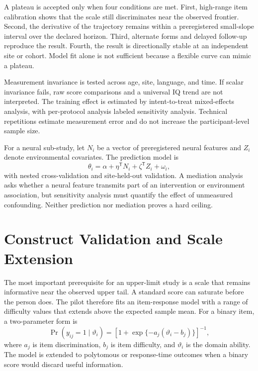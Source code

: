 \documentclass[conference]{IEEEtran}
\begin{document}
A plateau is accepted only when four conditions are met. First, high-range item calibration shows that the scale still discriminates near the observed frontier. Second, the derivative of the trajectory remains within a preregistered small-slope interval over the declared horizon. Third, alternate forms and delayed follow-up reproduce the result. Fourth, the result is directionally stable at an independent site or cohort. Model fit alone is not sufficient because a flexible curve can mimic a plateau.

Measurement invariance is tested across age, site, language, and time. If scalar invariance fails, raw score comparisons and a universal IQ trend are not interpreted. The training effect is estimated by intent-to-treat mixed-effects analysis, with per-protocol analysis labeled sensitivity analysis. Technical repetitions estimate measurement error and do not increase the participant-level sample size.

For a neural sub-study, let $N_i$ be a vector of preregistered neural features and $Z_i$ denote environmental covariates. The prediction model is
\begin{equation}
\theta_i=\alpha+\eta^{\mathsf T}N_i+\zeta^{\mathsf T}Z_i+\omega_i,
\label{eq:neural}
\end{equation}
with nested cross-validation and site-held-out validation. A mediation analysis asks whether a neural feature transmits part of an intervention or environment association, but sensitivity analysis must quantify the effect of unmeasured confounding. Neither prediction nor mediation proves a hard ceiling.

\section{Construct Validation and Scale Extension}
\label{sec:validation}
The most important prerequisite for an upper-limit study is a scale that remains informative near the observed upper tail. A standard score can saturate before the person does. The pilot therefore fits an item-response model with a range of difficulty values that extends above the expected sample mean. For a binary item, a two-parameter form is
\begin{equation}
\Pr(y_{ij}=1\mid\vartheta_i)=[1+\exp\{-a_j(\vartheta_i-b_j)\}]^{-1},
\label{eq:irt}
\end{equation}
where $a_j$ is item discrimination, $b_j$ is item difficulty, and $\vartheta_i$ is the domain ability. The model is extended to polytomous or response-time outcomes when a binary score would discard useful information.
\end{document}
